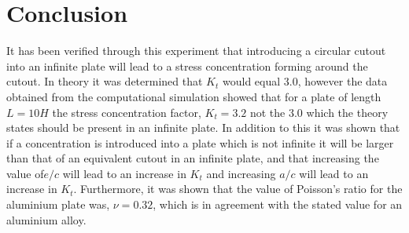 \documentclass[11pt,twocolumn]{article} %
\begin{document}
\section{Conclusion}
It has been verified through this experiment that introducing a circular cutout into an infinite plate will lead to a stress concentration forming around the cutout. In theory it was determined that $K_{t}$ would equal $3.0$, however the data obtained from the computational simulation showed that for a plate of length $L = 10H$ the stress concentration factor, $K_{t} = 3.2$ not the $3.0$ which the theory states should be present in an infinite plate. In addition to this it was shown that if a concentration is introduced into a plate which is not infinite it will be larger than that of an equivalent cutout in an infinite plate, and that increasing the value of$e/c$ will lead to an increase in $K_{t}$ and increasing $a/c$ will lead to an increase in $K_{t}$. Furthermore, it was shown that  the value of Poisson's ratio for the aluminium plate was, $\nu = 0.32$, which is in agreement with the stated value for an aluminium alloy.
\clearpage
\onecolumn
\end{document}
